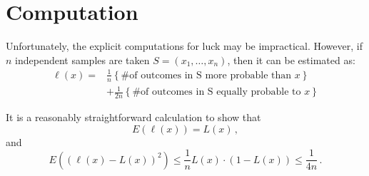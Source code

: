 \chapter*{Computation}

Unfortunately, the explicit computations for luck may be impractical.  However, if $n$ independent samples are taken $S=(x_1, \ldots, x_n)$, then it can be estimated as: 
\begin{align*}
 \ell(x) = & \frac{1}{n} \left\{\text{\# of outcomes in S more probable than $x$}\right\}  \\
 & + \frac{1}{2n} \left\{\text{\# of outcomes in S equally probable to $x$}\right\} 
\end{align*}

It is a reasonably straightforward calculation to show that
\begin{equation}
E(\ell(x))=L(x) \,,
\end{equation}
and
\begin{equation}
E((\ell(x)-L(x))^2) \leq \frac{1}{n} L(x) \cdot (1-L(x)) \leq \frac{1}{4n}\,.
\end{equation}

